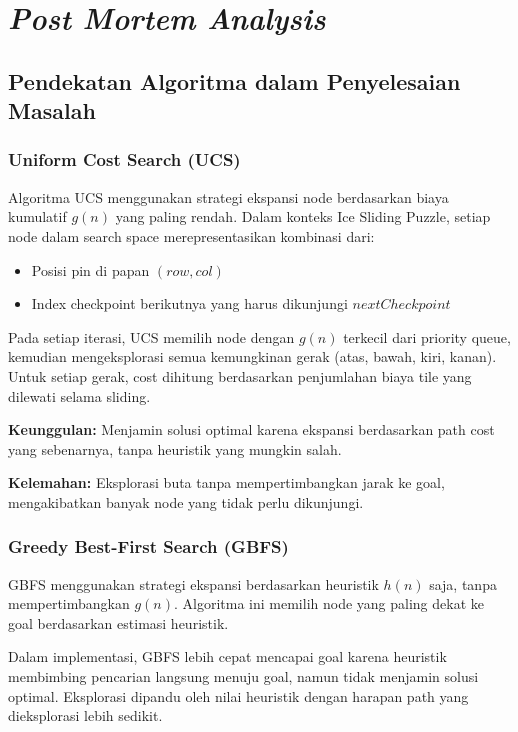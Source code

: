\section{\textit{Post Mortem Analysis}}

\subsection{Pendekatan Algoritma dalam Penyelesaian Masalah}

\subsubsection{Uniform Cost Search (UCS)}

Algoritma UCS menggunakan strategi ekspansi node berdasarkan biaya kumulatif $g(n)$ yang paling rendah. Dalam konteks Ice Sliding Puzzle, setiap node dalam search space merepresentasikan kombinasi dari:
\begin{itemize}
    \item Posisi pin di papan $(row, col)$
    \item Index checkpoint berikutnya yang harus dikunjungi $nextCheckpoint$
\end{itemize}

Pada setiap iterasi, UCS memilih node dengan $g(n)$ terkecil dari priority queue, kemudian mengeksplorasi semua kemungkinan gerak (atas, bawah, kiri, kanan). Untuk setiap gerak, cost dihitung berdasarkan penjumlahan biaya tile yang dilewati selama sliding.

\textbf{Keunggulan:} Menjamin solusi optimal karena ekspansi berdasarkan path cost yang sebenarnya, tanpa heuristik yang mungkin salah.

\textbf{Kelemahan:} Eksplorasi buta tanpa mempertimbangkan jarak ke goal, mengakibatkan banyak node yang tidak perlu dikunjungi.

\subsubsection{Greedy Best-First Search (GBFS)}

GBFS menggunakan strategi ekspansi berdasarkan heuristik $h(n)$ saja, tanpa mempertimbangkan $g(n)$. Algoritma ini memilih node yang paling dekat ke goal berdasarkan estimasi heuristik.

Dalam implementasi, GBFS lebih cepat mencapai goal karena heuristik membimbing pencarian langsung menuju goal, namun tidak menjamin solusi optimal. Eksplorasi dipandu oleh nilai heuristik dengan harapan path yang dieksplorasi lebih sedikit.

